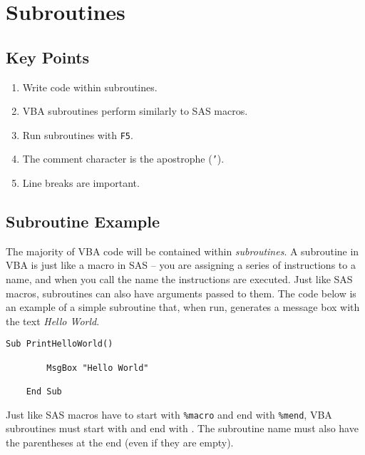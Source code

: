 \documentclass[11pt]{article}%
\begin{document}

\section{Subroutines}


\subsection{Key Points}

\begin{enumerate}
    \item Write code within subroutines.
    \item VBA subroutines perform similarly to SAS macros.
    \item Run subroutines with \texttt{F5}.
    \item The comment character is the apostrophe (\texttt{'}).
    \item Line breaks are important.
\end{enumerate}


\subsection{Subroutine Example}

The majority of VBA code will be contained within \textit{subroutines}. A subroutine in VBA is just like a macro in SAS -- you are assigning a series of instructions to a name, and when you call the name the instructions are executed. Just like SAS macros, subroutines can also have arguments passed to them. The code below is an example of a simple subroutine that, when run, generates a message box with the text \textit{Hello World}.\\

\begin{lstlisting}[style=A]
    Sub PrintHelloWorld()

        MsgBox "Hello World"

    End Sub
\end{lstlisting}

Just like SAS macros have to start with \texttt{\%macro} and end with \texttt{\%mend}, VBA subroutines must start with  and end with . The subroutine name must also have the parentheses at the end (even if they are empty).
\end{document}
